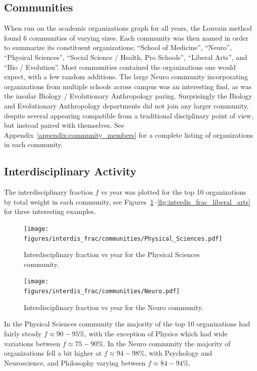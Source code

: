 \documentclass[notitlepage,aps,prd,nofootinbib]{revtex4-1}
\newcommand{\figures}{../outputs/plots}
\begin{document}
\subsection{Communities}
When run on the academic organizations graph for all years, the Louvain method found 6 communities of varying sizes. Each community was then named in order to summarize its constituent organizations; ``School of Medicine'', ``Neuro'', ``Physical Sciences'', ``Social Science / Health, Pro Schools'', ``Liberal Arts'', and ``Bio / Evolution''. Most communities contained the organizations one would expect, with a few random additions. The large Neuro community incorporating organizations from multiple schools across campus was an interesting find, as was the insular Biology / Evolutionary Anthropology paring. Surprisingly the Biology and Evolutionary Anthropology departments did not join any larger community, despite several appearing compatible from a traditional disciplinary point of view, but instead paired with themselves. See Appendix~\ref{appendix:community_members} for a complete listing of organizations in each community.


\subsection{Interdisciplinary Activity}
The interdisciplinary fraction $f$ vs year was plotted for the top 10 organizations by total weight in each community, see Figures~\ref{fig:interdis_frac_physical_sciences}--\ref{fig:interdis_frac_liberal_arts} for three interesting examples.

\begin{figure}[!htb]\centering
  \texttt{[image: \\figures/interdis\_frac/communities/Physical\_Sciences.pdf]}
  \caption{Interdisciplinary fraction vs year for the Physical Sciences community.}
  \label{fig:interdis_frac_physical_sciences}
\end{figure}

\begin{figure}[!htb]\centering
  \texttt{[image: \\figures/interdis\_frac/communities/Neuro.pdf]}
  \caption{Interdisciplinary fraction vs year for the Neuro community.}
  \label{fig:interdis_frac_neuro}
\end{figure}

In the Physical Sciences community the majority of the top 10 organizations had fairly steady $f \approx 90-95\%$, with the exception of Physics which had wide variations between $f \approx 75-90\%$. In the Neuro community the majority of organizations fell a bit higher at $f \approx 94-98\%$, with Psychology and Neuroscience, and Philosophy varying between $f \approx 84-94\%$.
\end{document}
